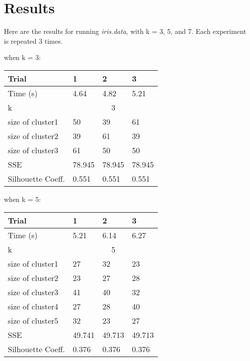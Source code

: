 \documentclass[12pt]{article}
\begin{document}
\section*{Results}
\begin{flushleft}
Here are the results for running \textit{iris.data}, with k = 3, 5, and 7. Each experiment is repeated 3 times.
\end{flushleft}
when k = 3:
\begin{table}[h]
\centering
\begin{tabular}{|l|l|l|l|}
\hline
Trial             & 1      & 2      & 3      \\ \hline
Time (s)          & 4.64   & 4.82   & 5.21  \\ \hline
k                 & \multicolumn{3}{c|}{3}    \\ \hline
size of cluster1  & 50     & 39     & 61     \\ \hline
size of cluster2  & 39     & 61     & 39     \\ \hline
size of cluster3  & 61     & 50     & 50     \\ \hline
SSE               & 78.945 & 78.945 & 78.945 \\ \hline
Silhouette Coeff. & 0.551  & 0.551  & 0.551  \\ \hline
\end{tabular}
\end{table}

\begin{flushleft}
when k = 5:
\end{flushleft}
\begin{table}[h]
\centering
\begin{tabular}{|l|l|l|l|}
\hline
Trial             & 1      & 2      & 3     \\ \hline
Time (s)          & 5.21   & 6.14   & 6.27  \\ \hline
k                 & \multicolumn{3}{c|}{5}  \\ \hline
size of cluster1  & 27     & 32     & 23    \\ \hline
size of cluster2  & 23     & 27     & 28    \\ \hline
size of cluster3  & 41     & 40     & 32    \\ \hline
size of cluster4  & 27     & 28     & 40    \\ \hline
size of cluster5  & 32     & 23     & 27    \\ \hline
SSE               & 49.741 & 49.713 & 49.713  \\ \hline
Silhouette Coeff. & 0.376  & 0.376  & 0.376 \\ \hline
\end{tabular}
\end{table}
\end{document}
